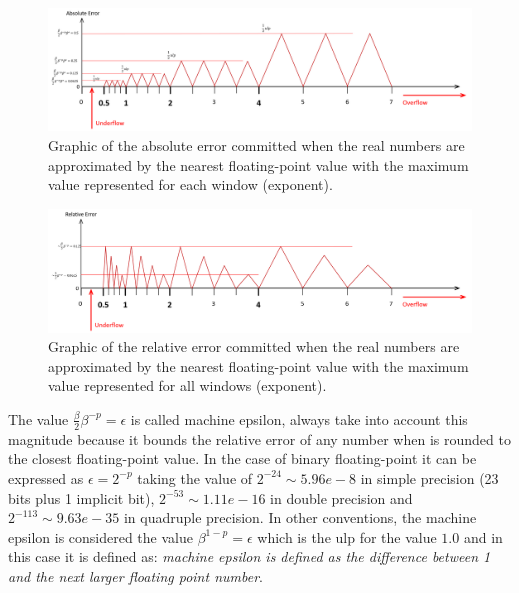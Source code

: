 \begin{figure}[h]
    \centering
    \includegraphics[width= \textwidth]{./doc/Figures/AbsErrorGraph.png}
    \caption{Graphic of the absolute error committed when the real numbers are approximated by the nearest floating-point value with the 
    maximum value represented for each window (exponent).}
    \label{fig:AbsErrorGraph}
\end{figure}

\begin{figure}[h]
    \centering
    \includegraphics[width= \textwidth]{./doc/Figures/RelErrorGraph.png}
    \caption{Graphic of the relative error committed when the real numbers are approximated by the nearest floating-point value with the 
    maximum value represented for all windows (exponent).}
    \label{fig:RelErrorGraph}
\end{figure}

\begin{IN}
    The value $\frac{\beta}{2}\beta^{-p} = \epsilon$ is called machine epsilon, always take into account this magnitude because it bounds the 
    relative error of any number when is rounded to the closest floating-point value. In the case of binary floating-point it can be 
    expressed as $\epsilon = 2^{-p}$ taking the value of $2^{-24} \sim 5.96e-8$ in simple precision (23 bits plus 1 implicit bit), $2^{-53} 
    \sim 1.11e-16$ in double precision and $2^{-113} \sim 9.63e-35$ in quadruple precision. In other conventions, the machine epsilon is 
    considered the value $\beta^{1-p} = \epsilon$ which is the ulp for the value $1.0$ and in this case it is defined as: \textit{machine 
    epsilon is defined as the difference between 1 and the next larger floating point number}.
\end{IN}

